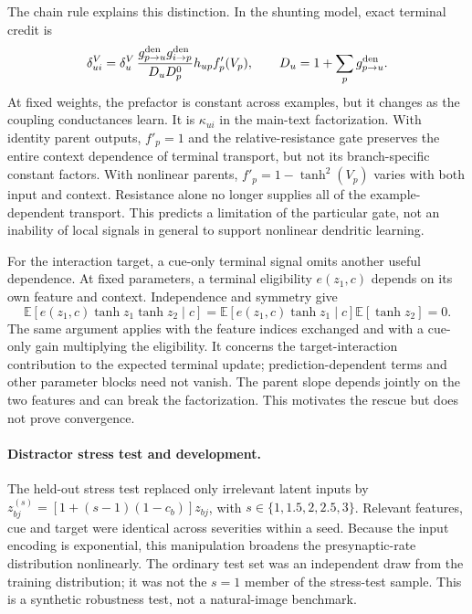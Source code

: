 The chain rule explains this distinction. In the shunting model, exact
terminal credit is
\begin{equation}
\delta_{ui}^V=\delta_u^V\,
\frac{g_{p\to u}^{\rm den}g_{i\to p}^{\rm den}}{D_uD_p^0}
h_{up} f'_p(V_p),\qquad
D_u=1+\sum_p g_{p\to u}^{\rm den}.
\end{equation}
At fixed weights, the prefactor is constant across examples, but it changes
as the coupling conductances learn. It is $\kappa_{ui}$ in the main-text
factorization. With identity
parent outputs, $f'_p=1$ and the relative-resistance gate preserves the
entire context dependence of terminal transport, but not its branch-specific
constant factors. With nonlinear parents, $f'_p=1-\tanh^2(V_p)$ varies with
both input and context. Resistance alone no longer supplies all of the
example-dependent transport. This predicts a limitation of the particular
gate, not an inability of local signals in general to support nonlinear
dendritic learning.

For the interaction target, a cue-only terminal signal omits another useful dependence. At fixed parameters, a terminal eligibility $e(z_1,c)$ depends on its own feature and context. Independence and symmetry give
\[
\mathbb E[e(z_1,c)\tanh z_1\tanh z_2\mid c]
=\mathbb E[e(z_1,c)\tanh z_1\mid c]\mathbb E[\tanh z_2]=0.
\]
The same argument applies with the feature indices exchanged and with a cue-only gain multiplying the eligibility. It concerns the target-interaction contribution to the expected terminal update; prediction-dependent terms and other parameter blocks need not vanish. The parent slope depends jointly on the two features and can break the factorization. This motivates the rescue but does not prove convergence.

\paragraph{Distractor stress test and development.}
The held-out stress test replaced only irrelevant latent inputs by
$z_{bj}^{(s)}=[1+(s-1)(1-c_b)]z_{bj}$, with
$s\in\{1,1.5,2,2.5,3\}$. Relevant features, cue and target were identical
across severities within a seed. Because the input encoding is exponential,
this manipulation broadens the presynaptic-rate distribution nonlinearly.
The ordinary test set was an independent draw from the training distribution;
it was not the $s=1$ member of the stress-test sample. This is a synthetic
robustness test, not a natural-image benchmark.


